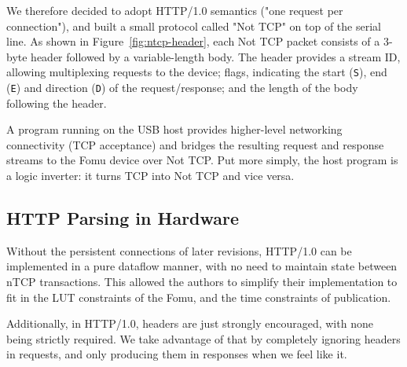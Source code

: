 \documentclass[sigconf,authorversion,nonacm]{acmart}
\begin{document}
We therefore decided to adopt HTTP/1.0 semantics ("one request per connection"), and built a small protocol
called "Not TCP" on top of the serial line. As shown in Figure~\ref{fig:ntcp-header}, each Not TCP packet consists of a 3-byte header followed by a variable-length body. The header provides a stream ID, allowing multiplexing requests to the device; flags, indicating the start (\texttt{S}), end (\texttt{E}) and direction (\texttt{D}) of the request/response; and the length of the body following the header.




A program running on the USB host provides higher-level networking connectivity (TCP acceptance)
and bridges the resulting request and response streams to the Fomu device over Not TCP.
Put more simply, the host program is a logic inverter: it turns TCP into Not TCP and vice versa.

\subsection{HTTP Parsing in Hardware}



Without the persistent connections of later revisions, HTTP/1.0 can be implemented in a pure dataflow manner, with no need to maintain state between nTCP transactions. This allowed the authors to simplify their implementation to fit in the LUT constraints of the Fomu, and the time constraints of publication.

Additionally, in HTTP/1.0, headers are just strongly encouraged, with none being strictly required.
We take advantage of that by completely ignoring headers in requests, and only producing
them in responses when we feel like it.
\end{document}
